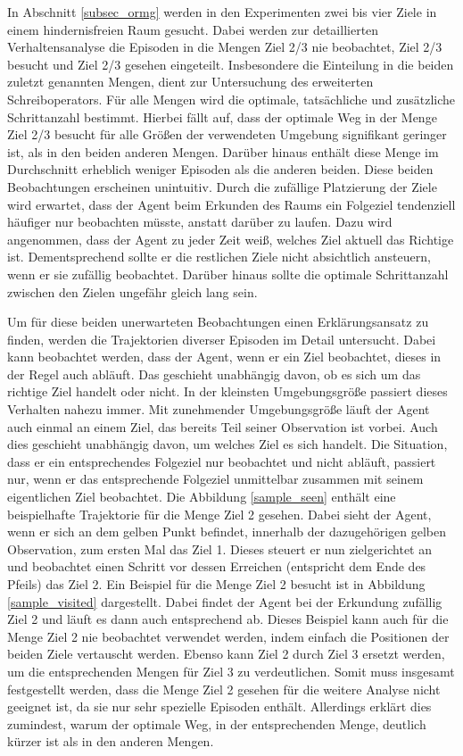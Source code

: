 In Abschnitt \ref{subsec_ormg} werden in den Experimenten zwei bis vier Ziele in einem hindernisfreien Raum gesucht. Dabei werden zur detaillierten Verhaltensanalyse die Episoden in die Mengen \glqq Ziel 2/3 nie beobachtet\grqq{}, \glqq Ziel 2/3 besucht\grqq{} und \glqq Ziel 2/3 gesehen\grqq{} eingeteilt. Insbesondere die Einteilung in die beiden zuletzt genannten Mengen, dient zur Untersuchung des erweiterten Schreiboperators. Für alle Mengen wird die optimale, tatsächliche und zusätzliche Schrittanzahl bestimmt. Hierbei fällt auf, dass der optimale Weg in der Menge \glqq Ziel 2/3 besucht\grqq{} für alle Größen der verwendeten Umgebung signifikant geringer ist, als in den beiden anderen Mengen. Darüber hinaus enthält diese Menge im Durchschnitt erheblich weniger Episoden als die anderen beiden. Diese beiden Beobachtungen erscheinen unintuitiv. Durch die zufällige Platzierung der Ziele wird erwartet, dass der Agent beim Erkunden des Raums ein Folgeziel tendenziell häufiger nur beobachten müsste, anstatt darüber zu laufen. Dazu wird angenommen, dass der Agent zu jeder Zeit weiß, welches Ziel aktuell das Richtige ist. Dementsprechend sollte er die restlichen Ziele nicht absichtlich ansteuern, wenn er sie zufällig beobachtet. Darüber hinaus sollte die optimale Schrittanzahl zwischen den Zielen ungefähr gleich lang sein.

Um für diese beiden unerwarteten Beobachtungen einen Erklärungsansatz zu finden, werden die Trajektorien diverser Episoden im Detail untersucht. Dabei kann beobachtet werden, dass der Agent, wenn er ein Ziel beobachtet, dieses in der Regel auch abläuft. Das geschieht unabhängig davon, ob es sich um das richtige Ziel handelt oder nicht. In der kleinsten Umgebungsgröße passiert dieses Verhalten nahezu immer. Mit zunehmender Umgebungsgröße läuft der Agent auch einmal an einem Ziel, das bereits Teil seiner Observation ist vorbei. Auch dies geschieht unabhängig davon, um welches Ziel es sich handelt. Die Situation, dass er ein entsprechendes Folgeziel nur beobachtet und nicht abläuft, passiert nur, wenn er das entsprechende Folgeziel unmittelbar zusammen mit seinem eigentlichen Ziel beobachtet. Die Abbildung \ref{sample_seen} enthält eine beispielhafte Trajektorie für die Menge \glqq Ziel 2 gesehen\grqq{}. Dabei sieht der Agent, wenn er sich an dem gelben Punkt befindet, innerhalb der dazugehörigen gelben Observation, zum ersten Mal das Ziel 1. Dieses steuert er nun zielgerichtet an und beobachtet einen Schritt vor dessen Erreichen (entspricht dem Ende des Pfeils) das Ziel 2. Ein Beispiel für die Menge \glqq Ziel 2 besucht\grqq{} ist in Abbildung \ref{sample_visited} dargestellt. Dabei findet der Agent bei der Erkundung zufällig Ziel 2 und läuft es dann auch entsprechend ab. Dieses Beispiel kann auch für die Menge \glqq Ziel 2 nie beobachtet\grqq{} verwendet werden, indem einfach die Positionen der beiden Ziele vertauscht werden. Ebenso kann Ziel 2 durch Ziel 3 ersetzt werden, um die entsprechenden Mengen für Ziel 3 zu verdeutlichen. Somit muss insgesamt festgestellt werden, dass die Menge \glqq Ziel 2 gesehen\grqq{} für die weitere Analyse nicht geeignet ist, da sie nur sehr spezielle Episoden enthält. Allerdings erklärt dies zumindest, warum der optimale Weg, in der entsprechenden Menge, deutlich kürzer ist als in den anderen Mengen.

